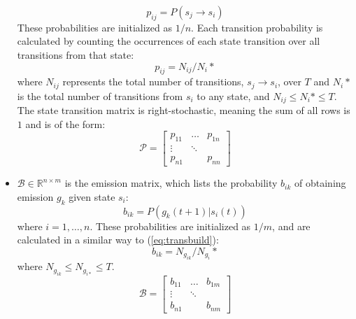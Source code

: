 \documentclass[letterpaper, 10 pt, conference]{ieeeconf}  %
\newcommand\NB[1]{$\spadesuit$\footnote{NB: #1}}
\begin{document}
\begin{itemize}
\begin{equation}
            p_{ij} = P(s_j\to s_i)
        \end{equation}
        These probabilities are initialized as $1/n$. Each transition probability is calculated by counting the occurrences of each state transition over all transitions from that state:
        \begin{equation} \label{eq:transbuild}
            p_{ij} = N_{ij}/N_{i}*
        \end{equation}
        where $N_{ij}$ represents the total number of transitions, $s_j \to s_i$, over $T$ and $N_{i}*$ is the total number of transitions from $s_i$ to any state, and $N_{ij} \leq N_{i}* \leq T$. The state transition matrix is right-stochastic, meaning the sum of all rows is $1$ and is of the form:
        \begin{equation}
            \mathcal{P} = 
                    \begin{bmatrix}
                        p_{11} & \dots & p_{1n} \\
                        \vdots & \ddots & \\
                        p_{n1} &    & p_{nn}
                    \end{bmatrix}
        \end{equation}
    \item $\mathcal{B}\in\mathbb{R}^{n\times m}$ is the emission matrix, which lists the probability $b_{ik}$ of obtaining emission $g_k$ given state $s_i$:
        \begin{equation} \label{eq:obsref}
            b_{ik} = P(g_k(t+1) \vert s_i(t))
        \end{equation}
        where $i = 1,\ldots,n$. These probabilities are initialized as $1/m$, and are calculated in a similar way to (\ref{eq:transbuild}):
        \begin{equation} \label{eq:obsbuild}
            b_{ik} = N_{g_{ik}}/N_{g_{i}}*
        \end{equation} 
        where $N_{g_{ik}} \leq N_{g_{i*}} \leq T$.
        \begin{equation}
            \mathcal{B} = 
                    \begin{bmatrix}
                        b_{11} & \dots & b_{1m} \\
                        \vdots & \ddots & \\
                        b_{n1} &    & b_{nm}
                    \end{bmatrix}
        \end{equation}
\end{itemize}
\end{document}
